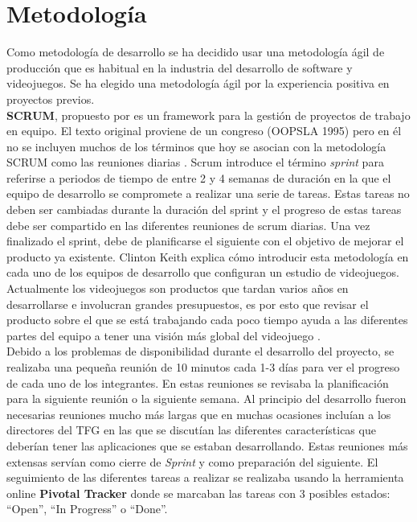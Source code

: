 \section{Metodolog\'ia}

Como metodolog\'ia de desarrollo se ha decidido usar una metodolog\'ia \'agil de producci\'on que es habitual en la industria del desarrollo de software y videojuegos. Se ha elegido una metodolog\'ia \'agil por la experiencia positiva en proyectos previos.\\

\textbf{SCRUM}, propuesto por \cite{scrum} es un framework para la gesti\'on de proyectos de trabajo en equipo. El texto original proviene de un congreso (OOPSLA 1995) pero en \'el no se incluyen muchos de los t\'erminos que hoy se asocian con la metodolog\'ia SCRUM como las reuniones diarias \citep{scrum2}. Scrum introduce el t\'ermino \textit{sprint} para referirse a periodos de tiempo de entre 2 y 4 semanas de duraci\'on en la que el equipo de desarrollo se compromete a realizar una serie de tareas. Estas tareas no deben ser cambiadas durante la duraci\'on del sprint y el progreso de estas tareas debe ser compartido en las diferentes reuniones de scrum diarias. Una vez finalizado el sprint, debe de planificarse el siguiente con el objetivo de mejorar el producto ya existente. Clinton Keith explica c\'omo introducir esta metodolog\'ia en cada uno de los equipos de desarrollo que configuran un estudio de videojuegos. Actualmente los videojuegos son productos que tardan varios a\~nos en desarrollarse e involucran grandes presupuestos, es por esto que revisar el producto sobre el que se est\'a trabajando cada poco tiempo ayuda a las diferentes partes del equipo a tener una visi\'on m\'as global del videojuego \citep{keith2010agile}.  \\

Debido a los problemas de disponibilidad durante el desarrollo del proyecto, se realizaba una peque\~na reuni\'on de 10 minutos cada 1-3 d\'ias para ver el progreso de cada uno de los integrantes. En estas reuniones se revisaba la planificaci\'on para la siguiente reuni\'on o la siguiente semana. Al principio del desarrollo fueron necesarias reuniones mucho m\'as largas que en muchas ocasiones inclu\'ian a los directores del TFG en las que se discut\'ian las diferentes caracter\'isticas que deber\'ian tener las aplicaciones que se estaban desarrollando. Estas reuniones m\'as extensas serv\'ian como cierre de \textit{Sprint} y como preparaci\'on del siguiente. El seguimiento de las diferentes tareas a realizar se realizaba usando la herramienta online \textbf{Pivotal Tracker} donde se marcaban las tareas con 3 posibles estados: ``Open'', ``In Progress'' o ``Done''.


